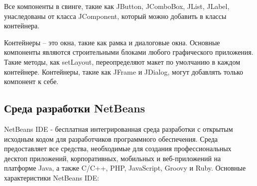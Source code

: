 Все компоненты в свинге, такие как JButton, JComboBox, JList, JLabel, унаследованы от класса JComponent, который можно добавить в классы контейнера.

Контейнеры – это окна, такие как рамка и диалоговые окна. Основные компоненты являются строительными блоками любого графического приложения. Такие методы, как setLayout, переопределяют макет по умолчанию в каждом контейнере. Контейнеры, такие как JFrame и JDialog, могут добавлять только компонент к себе.

\subsection{Среда разработки NetBeans}

NetBeans IDE - бесплатная интегрированная среда разработки с открытым исходным кодом для разработчиков программного обеспечения. Среда предоставляет все средства, необходимые для создания профессиональных десктоп приложений, корпоративных, мобильных и веб-приложений на платформе Java, а также C/C++, PHP, JavaScript, Groovy и Ruby. 
Основные характеристики NetBeans IDE:


